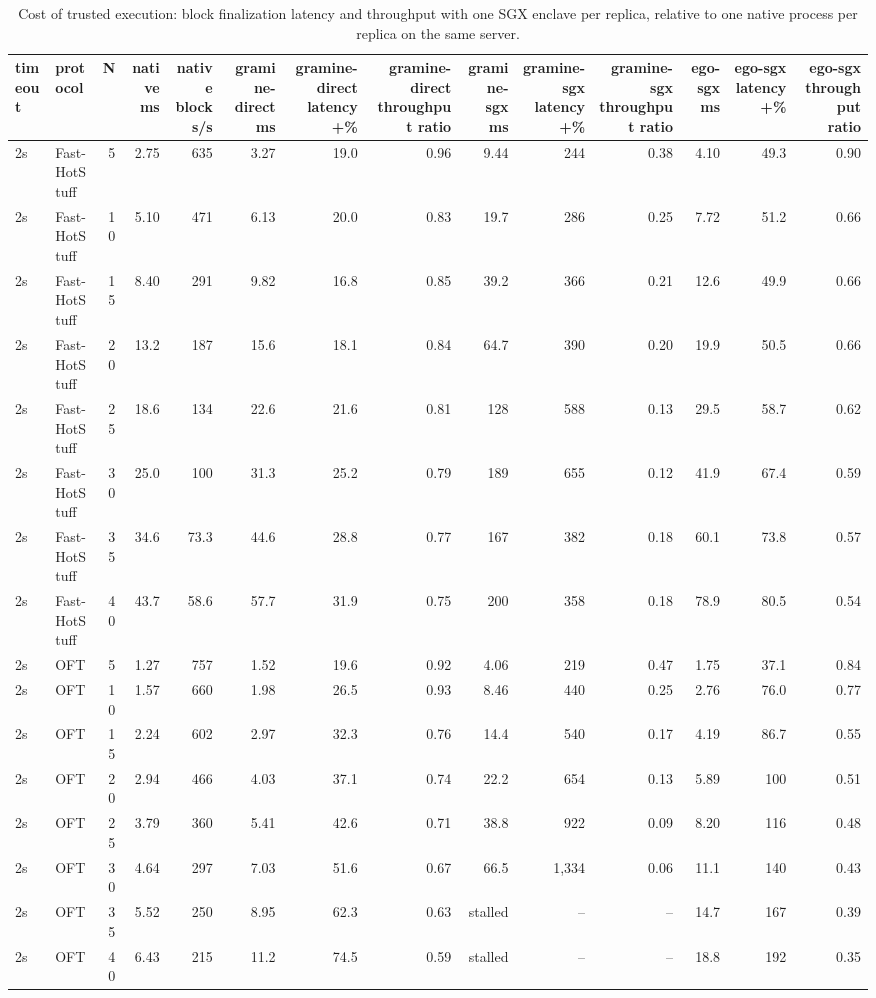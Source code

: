 \begin{table}[t]
\centering
\small
\caption{Cost of trusted execution: block finalization latency and throughput with one SGX enclave per replica, relative to one native process per replica on the same server.}
\label{tab:sgx-overhead}
\begin{tabular}{llrrrrrrrrrrrr}
\toprule
timeout & protocol & N & native ms & native blocks/s & gramine-direct ms & gramine-direct latency +\% & gramine-direct throughput ratio & gramine-sgx ms & gramine-sgx latency +\% & gramine-sgx throughput ratio & ego-sgx ms & ego-sgx latency +\% & ego-sgx throughput ratio \\
\midrule
2s & Fast-HotStuff & 5 & 2.75 & 635 & 3.27 & 19.0 & 0.96 & 9.44 & 244 & 0.38 & 4.10 & 49.3 & 0.90 \\
2s & Fast-HotStuff & 10 & 5.10 & 471 & 6.13 & 20.0 & 0.83 & 19.7 & 286 & 0.25 & 7.72 & 51.2 & 0.66 \\
2s & Fast-HotStuff & 15 & 8.40 & 291 & 9.82 & 16.8 & 0.85 & 39.2 & 366 & 0.21 & 12.6 & 49.9 & 0.66 \\
2s & Fast-HotStuff & 20 & 13.2 & 187 & 15.6 & 18.1 & 0.84 & 64.7 & 390 & 0.20 & 19.9 & 50.5 & 0.66 \\
2s & Fast-HotStuff & 25 & 18.6 & 134 & 22.6 & 21.6 & 0.81 & 128 & 588 & 0.13 & 29.5 & 58.7 & 0.62 \\
2s & Fast-HotStuff & 30 & 25.0 & 100 & 31.3 & 25.2 & 0.79 & 189 & 655 & 0.12 & 41.9 & 67.4 & 0.59 \\
2s & Fast-HotStuff & 35 & 34.6 & 73.3 & 44.6 & 28.8 & 0.77 & 167 & 382 & 0.18 & 60.1 & 73.8 & 0.57 \\
2s & Fast-HotStuff & 40 & 43.7 & 58.6 & 57.7 & 31.9 & 0.75 & 200 & 358 & 0.18 & 78.9 & 80.5 & 0.54 \\
2s & OFT & 5 & 1.27 & 757 & 1.52 & 19.6 & 0.92 & 4.06 & 219 & 0.47 & 1.75 & 37.1 & 0.84 \\
2s & OFT & 10 & 1.57 & 660 & 1.98 & 26.5 & 0.93 & 8.46 & 440 & 0.25 & 2.76 & 76.0 & 0.77 \\
2s & OFT & 15 & 2.24 & 602 & 2.97 & 32.3 & 0.76 & 14.4 & 540 & 0.17 & 4.19 & 86.7 & 0.55 \\
2s & OFT & 20 & 2.94 & 466 & 4.03 & 37.1 & 0.74 & 22.2 & 654 & 0.13 & 5.89 & 100 & 0.51 \\
2s & OFT & 25 & 3.79 & 360 & 5.41 & 42.6 & 0.71 & 38.8 & 922 & 0.09 & 8.20 & 116 & 0.48 \\
2s & OFT & 30 & 4.64 & 297 & 7.03 & 51.6 & 0.67 & 66.5 & 1,334 & 0.06 & 11.1 & 140 & 0.43 \\
2s & OFT & 35 & 5.52 & 250 & 8.95 & 62.3 & 0.63 & stalled & – & – & 14.7 & 167 & 0.39 \\
2s & OFT & 40 & 6.43 & 215 & 11.2 & 74.5 & 0.59 & stalled & – & – & 18.8 & 192 & 0.35 \\
\bottomrule
\end{tabular}
\end{table}
